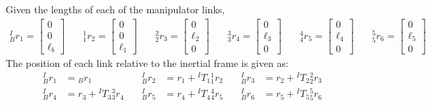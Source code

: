\documentclass[12pt]{report}
\begin{document}
Given the lengths of each of the manipulator links,
\[
\begin{aligned}
  ^I_Br_1 = \begin{bmatrix} 0\\0\\ \ell_b\end{bmatrix} & \quad
  ^1_1r_2 = \begin{bmatrix} 0\\0\\ \ell_1\end{bmatrix} & \quad
  ^2_2r_3 = \begin{bmatrix} 0\\\ell_2\\ 0\end{bmatrix} & \quad
  ^3_3r_4 = \begin{bmatrix} 0\\\ell_3\\ 0\end{bmatrix} & \quad
  ^4_4r_5 = \begin{bmatrix} 0\\\ell_4\\ 0\end{bmatrix} & \quad
  ^5_5r_6 = \begin{bmatrix} 0\\\ell_5\\ 0\end{bmatrix} & \quad
\end{aligned}
\]
The position of each link relative to the inertial frame is given as:
\[
\begin{aligned}
^I_Br_1 &= {}_Br_1 &\quad
^I_Br_2 &= r_1 + {}^IT_1 {}^1_1r_2 &\quad
^I_Br_3 &= r_2 + {}^IT_2 {}^2_2r_3 \\
^I_Br_4 &= r_3 + {}^IT_3 {}^3_3r_4 &\quad
^I_Br_5 &= r_4 + {}^IT_4 {}^4_4r_5 &\quad
^I_Br_6 &= r_5 + {}^IT_5 {}^5_5r_6
\end{aligned}
\]
\end{document}
